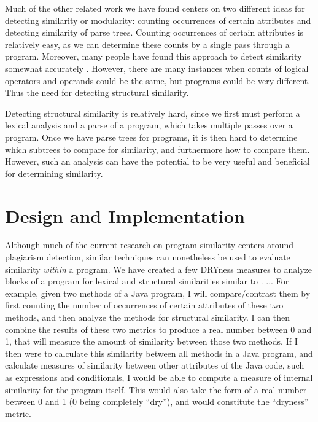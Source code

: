 \documentclass{article}
\begin{document}
Much of the other related work we have found centers on two different ideas for detecting similarity or modularity: counting occurrences
of certain attributes and detecting similarity of parse trees. Counting occurrences of certain attributes is relatively easy, as we can
determine these counts by a single pass through a program. Moreover, many people have found this approach to detect similarity 
somewhat accurately \cite{Modularity1979}\cite{PlagiarismProgrammingAssignments}. However, there are many instances when counts of
logical operators and operands could be the same, but programs could be very different. Thus the need for detecting structural similarity.

Detecting structural similarity is relatively hard, since we first must perform a lexical analysis and a parse of a program, which takes
multiple passes over a program. Once we have parse trees for programs, it is then hard to determine which subtrees to compare for
similarity, and furthermore how to compare them. However, such an analysis can have the potential to be very useful and beneficial
for determining similarity\cite{ProgramSimilarityPopulations}\cite{PlagiarismProgrammingAssignments}.

\section{Design and Implementation}

Although much of the current research on program similarity centers around plagiarism detection, similar techniques can nonetheless
 be used to evaluate similarity \textit{within} a program. 
We have created a few DRYness measures to analyze blocks of a program for lexical and structural similarities similar to \cite{ProgramSimilarityPopulations}. ... For example, given two methods of a Java program, I will compare/contrast them by first counting the number of occurrences of certain attributes of these two methods, and then analyze the methods for structural similarity. I can then combine the results of these two metrics to produce a real number between 0 and 1, that will measure the amount of similarity between those two methods. If I then were to calculate this similarity between all methods in a Java program, and calculate measures of similarity between other attributes of the Java code, such as expressions and conditionals, I would be able to compute a measure of internal similarity for the program itself. This would also take the form of a real number between 0 and 1 (0 being completely ``dry''), and would constitute the ``dryness'' metric.
\end{document}
